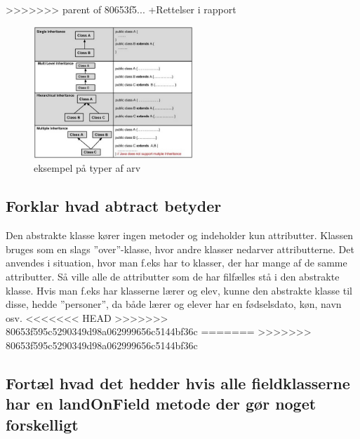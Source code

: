 >>>>>>> parent of 80653f5... +Rettelser i rapport
\begin{figure}[h]\label{fig:types_of_inheritance.jpg} 
    \advance\leftskip-3cm
    \includegraphics[width=6cm]{fig/types_of_inheritance.jpg}
    \caption{eksempel på typer af arv}
\end{figure}
\subsection{Forklar hvad abtract betyder}
Den abstrakte klasse kører ingen metoder og indeholder kun attributter. Klassen bruges som en slags ”over”-klasse, hvor andre klasser nedarver attributterne. Det anvendes i situation, hvor man f.eks har to klasser, der har mange af de samme attributter. Så ville alle de attributter som de har filfælles stå i den abstrakte klasse.
Hvis man f.eks har klasserne lærer og elev, kunne den abstrakte klasse til disse, hedde ”personer”, da både lærer og elever har en fødselsdato, køn, navn osv.
<<<<<<< HEAD
>>>>>>> 80653f595c5290349d98a062999656c5144bf36c
=======
>>>>>>> 80653f595c5290349d98a062999656c5144bf36c

\subsection{Fortæl hvad det hedder hvis alle fieldklasserne har en landOnField metode der gør noget forskelligt}

